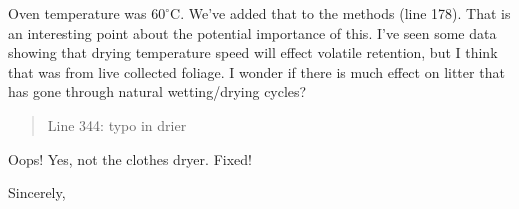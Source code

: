 \documentclass[letterpaper, 12pt]{letter}
\begin{document}
\begin{letter}{}
Oven temperature was $60^\circ$C. We've added that to the methods (line 178).
That is an interesting point about the potential importance of this. I've seen
some data showing that drying temperature speed will effect volatile retention,
but I think that was from live collected foliage. I wonder if there is much
effect on litter that has gone through natural wetting/drying cycles?

\begin{quote}
Line 344: typo in drier
\end{quote}

Oops! Yes, not the clothes dryer. Fixed!

\closing{Sincerely,}

\end{letter}
\end{document}
